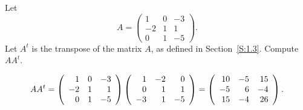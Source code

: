 \documentclass{ximera}
\begin{document}
\begin{exercise} \label{c4.6.3}
Let
\[
A = \left(\begin{array}{rrr} 1 & 0 & -3\\ -2 & 1 & 1 \\ 0 & 1 & -5 \end{array}
\right).
\]
Let $A^t$ is the transpose of the matrix $A$, as defined in
Section~\ref{S:1.3}. Compute $AA^t$.

\begin{solution}

\[ AA^t = \left(\begin{array}{rrr} 1 & 0 & -3 \\ -2 & 1 & 1 \\ 0 & 1 & -5\end{array}\right)
\left(\begin{array}{rrr} 1 & -2 & 0 \\ 0 & 1 & 1 \\ -3 & 1 & -5\end{array}\right) =
\left(\begin{array}{rrr} 10 & -5 & 15 \\ -5 & 6 & -4 \\ 15 & -4 & 26\end{array}\right). \]



\end{solution}
\end{exercise}

\CEXER
\end{document}
